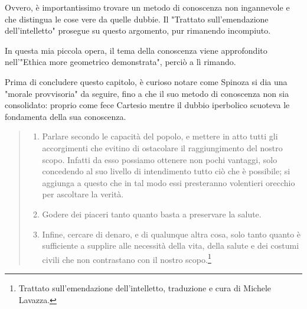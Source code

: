 Ovvero, è importantissimo trovare un metodo di conoscenza non ingannevole e che distingua le cose vere da quelle dubbie. Il "Trattato sull'emendazione dell'intelletto" prosegue su questo argomento, pur rimanendo incompiuto.

In questa mia piccola opera, il tema della conoscenza viene approfondito nell'"Ethica more geometrico demonstrata", perciò a lì rimando.

Prima di concludere questo capitolo, è curioso notare come Spinoza si dia una "morale provvisoria" da seguire, fino a che il suo metodo di conoscenza non sia consolidato: proprio come fece Cartesio mentre il dubbio iperbolico scuoteva le fondamenta della sua conoscenza.

\begin{quotation}
	\small \begin{enumerate}
		\item Parlare secondo le capacità del popolo, e mettere in atto tutti gli accorgimenti che evitino
		di ostacolare il raggiungimento del nostro scopo. Infatti da esso possiamo ottenere non pochi
		vantaggi, solo concedendo al suo livello di intendimento tutto ciò che è possibile; si aggiunga a
		questo che in tal modo essi presteranno volentieri orecchio per ascoltare la verità.
		\item Godere dei piaceri tanto quanto basta a preservare la salute.
		\item Infine, cercare di denaro, e di qualunque altra cosa, solo tanto quanto è sufficiente a
		supplire alle necessità della vita, della salute e dei costumi civili che non contrastano con il nostro
		scopo.\footnote{Trattato sull'emendazione dell'intelletto, traduzione e cura di Michele Lavazza.}
	\end{enumerate}
\end{quotation}

\newpage